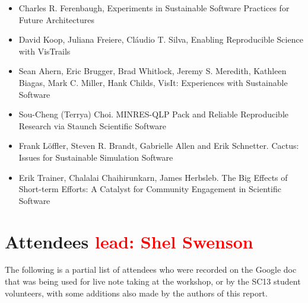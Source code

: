 \documentclass[11pt, oneside]{amsart}
\newcommand{\note}[1]{ {\textcolor{red}    { #1 }}}
\begin{document}
\begin{itemize}

\item Charles R. Ferenbaugh, Experiments in Sustainable Software
  Practices for Future Architectures~\cite{Ferenbaugh_WSSSPE}

\item David Koop, Juliana Freiere, Cl\'{a}udio T. Silva, Enabling
  Reproducible Science with VisTrails~\cite{Koop_WSSSPE}

\item Sean Ahern, Eric Brugger, Brad Whitlock, Jeremy S. Meredith,
  Kathleen Biagas, Mark C. Miller, Hank Childs, VisIt: Experiences
  with Sustainable Software~\cite{Ahern_WSSSPE}

\item Sou-Cheng (Terrya) Choi. MINRES-QLP Pack and Reliable
  Reproducible Research via Staunch Scientific Software~\cite{Choi_WSSSPE}

\item Frank L\"{o}ffler, Steven R. Brandt, Gabrielle Allen and Erik
  Schnetter. Cactus: Issues for Sustainable Simulation Software~\cite{Loffler_WSSSPE}

\item Erik Trainer, Chalalai Chaihirunkarn, James Herbsleb. The Big
  Effects of Short-term Efforts: A Catalyst for Community Engagement
  in Scientific Software~\cite{Trainer_WSSSPE}

\end{itemize}




\section{Attendees \note{lead: Shel Swenson}} \label{sec:attendees}


The following is a partial list of attendees who were recorded on the
Google doc~\cite{WSSSPE1-google-notes} that was being used for live note taking at the workshop, or by the SC13 student volunteers, with some additions also made by the authors of this report.
\end{document}

